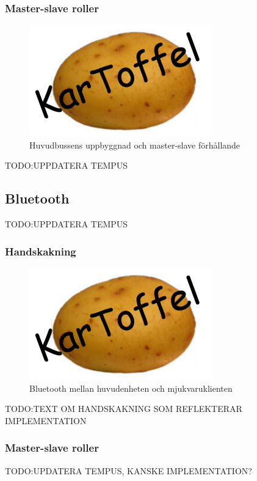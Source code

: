 \documentclass{article}
\begin{document}
\subsubsection{Master-slave roller}
\begin{figure}[H]
\centering 
\includegraphics[scale=0.56]{Logo}
\caption{Huvudbussens uppbyggnad och master-slave förhållande}
\label{fig:huvudbuss_masterslave}
\end{figure}

TODO:UPPDATERA TEMPUS

\subsection{Bluetooth}
\label{sec:bluetooth}
TODO:UPPDATERA TEMPUS

\subsubsection{Handskakning}
\label{sec:handskakning}
\begin{figure}[H]
\centering 
\includegraphics[scale=0.8]{Logo}
\caption{Bluetooth mellan huvudenheten och mjukvaruklienten}
\label{fig:Kommunikation_Bluetooth}
\end{figure}

TODO:TEXT OM HANDSKAKNING SOM REFLEKTERAR IMPLEMENTATION

\subsubsection{Master-slave roller}
\label{sec:bluetooth_master_slave}
TODO:UPDATERA TEMPUS, KANSKE IMPLEMENTATION?
\end{document}

